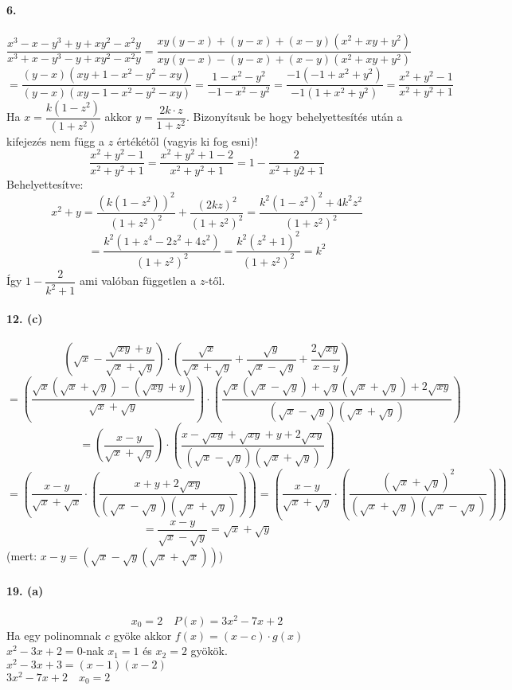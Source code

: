 \documentclass[12pt,a4paper,fleqn]{article}
\begin{document}
\textbf{6.} \\\\
$$ \dfrac{x^3-x-y^3+y+xy^2-x^2y}{x^3+x-y^3-y+xy^2-x^2y} =
  \dfrac{xy(y-x)+(y-x)+(x-y)(x^2+xy+y^2)}{xy(y-x)-(y-x)+(x-y)(x^2+xy+y^2)} $$
  $$= \dfrac{(y-x)(xy+1-x^2-y^2-xy)}{(y-x)(xy-1-x^2-y^2-xy)}
  = \dfrac{1-x^2-y^2}{-1-x^2-y^2} = \dfrac{-1(-1+x^2+y^2)}{-1(1+x^2+y^2)} = \dfrac{x^2+y^2-1}{x^2+y^2+1}$$
Ha $x = \dfrac{k(1-z^2)}{(1+z^2)}$ akkor $y = \dfrac{2k \cdot z}{1+z^2}$.
Bizonyítsuk be hogy behelyettesítés után a kifejezés nem függ a $z$ értékétől (vagyis ki fog esni)!
$$ \dfrac{x^2+y^2-1}{x^2+y^2+1} = \dfrac{x^2+y^2+1-2}{x^2+y^2+1} = 1 - \dfrac{2}{x^2+y2+1} $$
Behelyettesítve:
$$ x^2+y=\dfrac{(k(1-z^2))^2}{(1+z^2)^2} + \dfrac{(2kz)^2}{(1+z^2)^2} = \dfrac{k^2(1-z^2)^2+4k^2z^2}{(1+z^2)^2}$$
$$ = \dfrac{k^2(1+z^4-2z^2+4z^2)}{(1+z^2)^2} = \dfrac{k^2(z^2+1)^2}{(1+z^2)^2} = k^2$$
Így $1-\dfrac{2}{k^2+1}$ ami valóban független a $z$-től. \\\\
\textbf{12. (c)} \\\\
$$ \left(\sqrt{x} - \dfrac{\sqrt{xy}+y}{\sqrt{x}+\sqrt{y}}\right) \cdot \left( \dfrac{\sqrt{x}}{\sqrt{x}+\sqrt{y}} + \dfrac{\sqrt{y}}{\sqrt{x}-\sqrt{y}} + \dfrac{2\sqrt{xy}}{x-y} \right) $$
$$ = \left(\dfrac{\sqrt{x}(\sqrt{x}+\sqrt{y})-(\sqrt{xy}+y)}{\sqrt{x} + \sqrt{y}} \right) \cdot \left( \dfrac{\sqrt{x}(\sqrt{x}-\sqrt{y})+\sqrt{y}(\sqrt{x}+\sqrt{y})+2\sqrt{xy}}{(\sqrt{x}-\sqrt{y})(\sqrt{x}+\sqrt{y})} \right)$$
$$ = \left( \dfrac{x-y}{\sqrt{x}+\sqrt{y}} \right) \cdot \left( \dfrac{x-\sqrt{xy}+\sqrt{xy}+y+2\sqrt{xy}}{(\sqrt{x}-\sqrt{y})(\sqrt{x}+\sqrt{y})} \right)$$
$$ = \left( \dfrac{x-y}{\sqrt{x}+\sqrt{x}} \cdot \left( \dfrac{x+y+2\sqrt{xy}}{(\sqrt{x}-\sqrt{y})(\sqrt{x}+\sqrt{y})} \right) \right) = \left( \dfrac{x-y}{\sqrt{x}+\sqrt{y}} \cdot \left( \dfrac{(\sqrt{x}+\sqrt{y})^2}{(\sqrt{x}+\sqrt{y})(\sqrt{x}-\sqrt{y})} \right) \right)$$
$$ = \dfrac{x-y}{\sqrt{x} - \sqrt{y}} = \sqrt{x} + \sqrt{y}$$ (mert: $x-y=(\sqrt{x}-\sqrt{y}(\sqrt{x}+\sqrt{x}))$) \\\\
\textbf{19. (a)} \\\\
$$ x_0 = 2 \quad P(x)=3x^2 - 7x + 2 $$
Ha egy polinomnak $c$ gyöke akkor $f(x)=(x-c) \cdot g(x)$ \\
$x^2-3x+2=0$-nak $x_1=1$ és $x_2=2$ gyökök. \\
$x^2-3x+3=(x-1)(x-2)$ \\
$3x^2-7x+2 \quad x_0=2$ \\
\end{document}
